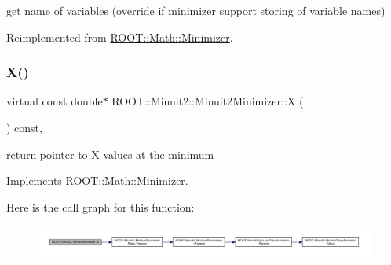 get name of variables (override if minimizer support storing of variable names) 



Reimplemented from \mbox{\hyperlink{classROOT_1_1Math_1_1Minimizer_a4d6a3c9c95608b35a25f16afd50690ad}{R\+O\+O\+T\+::\+Math\+::\+Minimizer}}.

\mbox{\label{classROOT_1_1Minuit2_1_1Minuit2Minimizer_ac9372eb08937cf14acb8862ba3166c26}} 
\subsubsection{\texorpdfstring{X()}{X()}\hspace{0.1cm}{\footnotesize\ttfamily [1/2]}}
{\footnotesize\ttfamily virtual const double$\ast$ R\+O\+O\+T\+::\+Minuit2\+::\+Minuit2\+Minimizer\+::X (\begin{DoxyParamCaption}{ }\end{DoxyParamCaption}) const\hspace{0.3cm}{\ttfamily [inline]}, {\ttfamily [virtual]}}



return pointer to X values at the minimum 



Implements \mbox{\hyperlink{classROOT_1_1Math_1_1Minimizer_a35c7c2caf54e548f892d84795209edad}{R\+O\+O\+T\+::\+Math\+::\+Minimizer}}.

Here is the call graph for this function\+:
\nopagebreak
\begin{figure}[H]
\begin{center}
\leavevmode
\includegraphics[width=350pt]{d0/d9c/classROOT_1_1Minuit2_1_1Minuit2Minimizer_ac9372eb08937cf14acb8862ba3166c26_cgraph}
\end{center}
\end{figure}
\mbox{\label{classROOT_1_1Minuit2_1_1Minuit2Minimizer_ac9372eb08937cf14acb8862ba3166c26}} 
